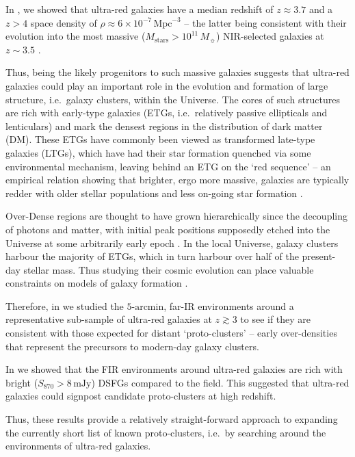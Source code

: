 \documentclass[a4paper, fleqn, usenatbib]{mnras}
\newcommand{\millijanksy}{\text{mJy}}
\newcommand{\msol}{M_{\sun}}
\newcommand{\mstars}{M_{\text{stars}}}
\newcommand{\urgs}{ultra-red galaxies}
\begin{document}
In , we showed that ultra-red galaxies have a median redshift of $z\approx3.7$ and a $z>4$ space density of $\rho\approx6\times 10^{-7}\,\text{Mpc}^{-3}$ -- the latter being consistent with their evolution into the most massive ($\mstars{}>10^{11}\,\msol$) NIR-selected galaxies at $z\sim3.5$ \citep{straatman14}.

Thus, being the likely progenitors to such massive galaxies suggests that ultra-red galaxies could play an important role in the evolution and formation of large structure, i.e.\ galaxy clusters, within the Universe.
The cores of such structures are rich with early-type galaxies (ETGs, i.e.\ relatively passive ellipticals and lenticulars) and mark the densest regions in the distribution of dark matter (DM).
These ETGs have commonly been viewed as transformed late-type galaxies (LTGs), which have had their star formation quenched via some environmental mechanism, leaving behind an ETG on the `red sequence' -- an empirical relation showing that brighter, ergo more massive, galaxies are typically redder with older stellar populations and less on-going star formation \citep{dressler97, bower98, baldry04, gerke07}.

Over-Dense regions are thought to have grown hierarchically since the decoupling of photons and matter, with initial peak positions supposedly etched into the Universe at some arbitrarily early epoch \citep{peebles70, spergel03}.
In the local Universe, galaxy clusters harbour the majority of ETGs, which in turn harbour over half of the present-day stellar mass.
Thus studying their cosmic evolution can place valuable constraints on models of galaxy formation \citep{springel05, robertson07, overzier09a}.

Therefore, in \citet[][hereafter ]{lewis17} we studied the $5\text{-arcmin}$, far-IR environments around a representative sub-sample of ultra-red galaxies at $z\gtrsim3$ to see if they are consistent with those expected for distant `proto-clusters' -- early over-densities that represent the precursors to modern-day galaxy clusters.

In  we showed that the FIR environments around \urgs{} are rich with bright ($S_{870}>8\,\millijanksy{}$) DSFGs compared to the field.
This suggested that ultra-red galaxies could signpost candidate proto-clusters at high redshift.

Thus, these results provide a relatively straight-forward approach to expanding the currently short list of known proto-clusters, i.e.\ by searching around the environments of ultra-red galaxies.
\end{document}
